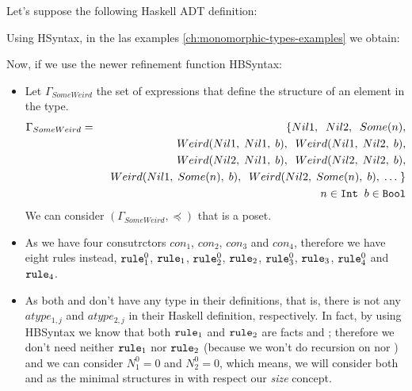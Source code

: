 	\begin{example}[SomeWeird]
		Let's suppose the following Haskell ADT definition:
		
		Using HSyntax, in the las examples \ref{ch:monomorphic-types-examples} we obtain:
		
		Now, if we use the newer refinement function HBSyntax:
		\begin{itemize}
			\item Let $\Gamma_{SomeWeird}$ the set of expressions that define the structure of an element in the  type.
			      \begin{eqnarray*}
			      	\Gamma_{SomeWeird} & = & \{ Nil1, \;\; Nil2, \;\; Some(n), \\
			      	&& \;\; Weird(Nil1, \; Nil1, \; b), \;\; Weird(Nil1, \; Nil2, \; b), \\
			      	&& \;\; Weird(Nil2, \; Nil1, \; b), \;\; Weird(Nil2, \; Nil2, \; b),  \\
			      	&& \;\; Weird(Nil1, \; Some(n), \; b), \;\; Weird(Nil2, \; Some(n), \; b), \; \ldots \; \} \\
			      	&& \;\; n \in \texttt{Int} \;\; b \in \texttt{Bool}
			      \end{eqnarray*}
			      We can consider $(\Gamma_{SomeWeird}, \preceq)$ that is a poset.
			\item As we have four consutrctors $con_1$, $con_2$, $con_3$ and $con_4$, therefore we have eight rules instead, $\texttt{rule}_{1}^{0}$, $\texttt{rule}_1$, $\texttt{rule}_{2}^{0}$, $\texttt{rule}_2$, $\texttt{rule}_{3}^{0}$, $\texttt{rule}_3$, $\texttt{rule}_{4}^{0}$ and $\texttt{rule}_4$.
			\item As both  and  don't have any type in their definitions, that is, there is not any $atype_{1,j}$ and $atype_{2,j}$ in their Haskell definition, respectively. In fact, by using HBSyntax we know that both $\texttt{rule}_1$ and $\texttt{rule}_2$ are facts  and ; therefore we don't need neither $\texttt{rule}_1$ nor $\texttt{rule}_2$ (because we won't do recursion on  nor ) and we can consider $N_{1}^{0} = 0$ and $N_{2}^{0} = 0$, which means, we will consider both  and  as the minimal structures in  with respect our \textit{size} concept.\\\\

\end{itemize}
\end{example}
